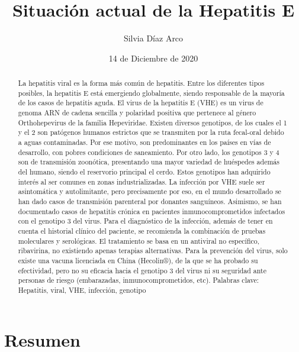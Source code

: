 \documentclass[12 pt]{article}
\title{Situación actual de la Hepatitis E}
\author{Silvia Díaz Arco}
\date{14 de Diciembre de 2020}
\begin{document}
\maketitle
\tableofcontents
\part{Resumen}
	\begin{abstract}
		La hepatitis viral es la forma más común de hepatitis. Entre los diferentes tipos posibles, la hepatitis E está emergiendo globalmente, siendo responsable de la mayoría de los casos de hepatitis aguda. El virus de la hepatitis E (VHE) es un virus de genoma ARN de cadena sencilla y polaridad positiva que pertenece al género Orthohepevirus de la familia Hepeviridae. Existen diversos genotipos, de los cuales el 1 y el 2 son patógenos humanos estrictos que se transmiten por la ruta fecal-oral debido a aguas contaminadas. Por ese motivo, son predominantes en los países en vías de desarrollo, con pobres condiciones de saneamiento. Por otro lado, los genotipos 3 y 4 son de transmisión zoonótica, presentando una mayor variedad de huéspedes además del humano, siendo el reservorio principal el cerdo. Estos genotipos han adquirido interés al ser comunes en zonas industrializadas. La infección por VHE suele ser asintomática y autolimitante, pero precisamente por eso, en el mundo desarrollado se han dado casos de transmisión parenteral por donantes sanguíneos. Asimismo, se han documentado casos de hepatitis crónica en pacientes inmunocomprometidos infectados con el genotipo 3 del virus. Para el diagnóstico de la infección, además de tener en cuenta el historial clínico del paciente, se recomienda la combinación de pruebas moleculares y serológicas. El tratamiento se basa en un antiviral no específico, ribavirina, no existiendo apenas terapias alternativas. Para la prevención del virus, solo existe una vacuna licenciada en China (Hecolin®), de la que se ha probado su efectividad, pero no su eficacia hacia el genotipo 3 del virus ni su seguridad ante personas de riesgo (embarazadas, inmunocomprometidos, etc). 
		Palabras clave: Hepatitis, viral, VHE, infección, genotipo	
	\end{abstract}
		
\end{document}
